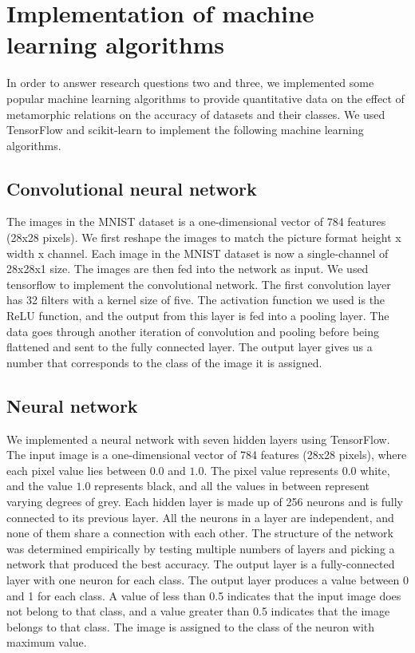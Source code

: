 \section{Implementation of machine learning algorithms}\label{Algorithms}
In order to answer research questions two and three, we implemented some popular machine learning algorithms to provide quantitative data on the effect of metamorphic relations on the accuracy of datasets and their classes. We used TensorFlow and scikit-learn to implement the following machine learning algorithms.

\subsection{Convolutional neural network}
The images in the MNIST dataset is a one-dimensional vector of 784 features (28x28 pixels). We first reshape the images to match the picture format height x width x channel. Each image in the MNIST dataset is now a single-channel of 28x28x1 size. The images are then fed into the network as input. We used tensorflow to implement the convolutional network. The first convolution layer has 32 filters with a kernel size of five. The activation function we used is the ReLU function, and the output from this layer is fed into a pooling layer. The data goes through another iteration of convolution and pooling before being flattened and sent to the fully connected layer. The output layer gives us a number that corresponds to the class of the image it is assigned.

\subsection{Neural network}
We implemented a neural network with seven hidden layers using TensorFlow. The input image is a one-dimensional vector of 784 features (28x28 pixels), where each pixel value lies between $0.0$ and $1.0$. The pixel value represents $0.0$ white, and the value $1.0$ represents black, and all the values in between represent varying degrees of grey. Each hidden layer is made up of 256 neurons and is fully connected to its previous layer. All the neurons in a layer are independent, and none of them share a connection with each other. The structure of the network was determined empirically by testing multiple numbers of layers and picking a network that produced the best accuracy. 
The output layer is a fully-connected layer with one neuron for each class. The output layer produces a value between 0 and 1 for each class. A value of less than 0.5 indicates that the input image does not belong to that class, and a value greater than 0.5 indicates that the image belongs to that class. The image is assigned to the class of the neuron with maximum value. 

